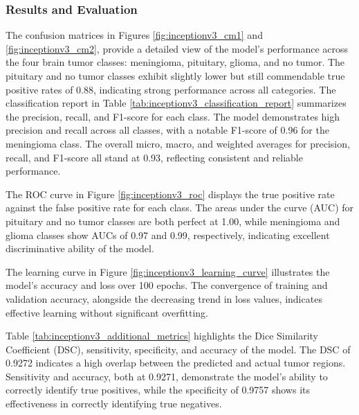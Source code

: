
\subsubsection{Results and Evaluation}


The confusion matrices in Figures \ref{fig:inceptionv3_cm1} and \ref{fig:inceptionv3_cm2}, provide a detailed view of the model's performance across the four brain tumor classes: meningioma, pituitary, glioma, and no tumor. The pituitary and no tumor classes exhibit slightly lower but still commendable true positive rates of 0.88, indicating strong performance across all categories. The classification report in Table \ref{tab:inceptionv3_classification_report} summarizes the precision, recall, and F1-score for each class. The model demonstrates high precision and recall across all classes, with a notable F1-score of 0.96 for the meningioma class. The overall micro, macro, and weighted averages for precision, recall, and F1-score all stand at 0.93, reflecting consistent and reliable performance.

The ROC curve in Figure \ref{fig:inceptionv3_roc} displays the true positive rate against the false positive rate for each class. The areas under the curve (AUC) for pituitary and no tumor classes are both perfect at 1.00, while meningioma and glioma classes show AUCs of 0.97 and 0.99, respectively, indicating excellent discriminative ability of the model.

The learning curve in Figure \ref{fig:inceptionv3_learning_curve} illustrates the model's accuracy and loss over 100 epochs. The convergence of training and validation accuracy, alongside the decreasing trend in loss values, indicates effective learning without significant overfitting.

Table \ref{tab:inceptionv3_additional_metrics} highlights the Dice Similarity Coefficient (DSC), sensitivity, specificity, and accuracy of the model. The DSC of 0.9272 indicates a high overlap between the predicted and actual tumor regions. Sensitivity and accuracy, both at 0.9271, demonstrate the model's ability to correctly identify true positives, while the specificity of 0.9757 shows its effectiveness in correctly identifying true negatives.

